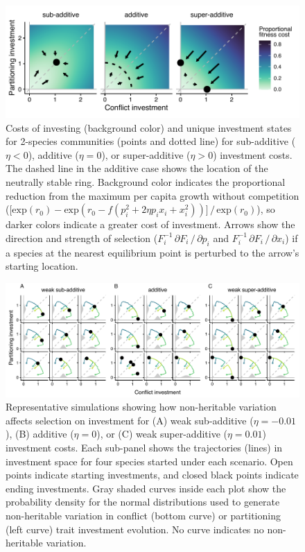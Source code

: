 \documentclass[11pt]{article}
\begin{document}
\clearpage


\begin{figure}[ht!]
\centering
\includegraphics[width=\textwidth,keepaspectratio]{2-tradeoffs_outcomes}
\caption{Costs of investing (background color) and unique
investment states for 2-species communities (points and dotted line) for
sub-additive ($\eta < 0$), additive ($\eta = 0$), or super-additive
($\eta > 0$) investment costs. The dashed line in the additive case
shows the location of the neutrally stable ring. Background color
indicates the proportional reduction from the maximum per capita growth without
competition
($\lbrack \text{exp}( r_{0} ) - \text{exp}( r_{0} - f( p_{i}^{2} + 2 \eta p_{i} x_{i} + x_{i}^{2} ) ) \rbrack \, / \, \text{exp}( r_{0} )$),
so darker colors indicate a greater cost of investment. Arrows show the
direction and strength of selection
($F_{i}^{- 1} \, \partial F_{i} \, / \, \partial p_{i}$ and
$F_{i}^{- 1} \, \partial F_{i} \, / \, \partial x_{i}$) if a species at the
nearest equilibrium point is perturbed to the arrow's starting location.}
\label{fig:tradeoffs-outcomes}
\end{figure}



\clearpage


\begin{figure}[ht!]
\centering
\includegraphics[width=\textwidth,keepaspectratio]{3-all_pheno}
\caption{Representative simulations showing how non-heritable
variation affects selection on investment for (A) weak sub-additive
($\eta = - 0.01$), (B) additive ($\eta = 0$), or (C) weak
super-additive ($\eta = 0.01$) investment costs. Each sub-panel shows
the trajectories (lines) in investment space for four species started
under each scenario. Open points indicate starting investments, and
closed black points indicate ending investments. Gray shaded curves
inside each plot show the probability density for the normal
distributions used to generate non-heritable variation in conflict (bottom
curve) or partitioning (left curve) trait investment evolution. No curve
indicates no non-heritable variation.}
\label{fig:non-heritable}
\end{figure}
\end{document}
